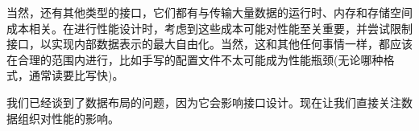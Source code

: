 当然，还有其他类型的接口，它们都有与传输大量数据的运行时、内存和存储空间成本相关。在进行性能设计时，考虑到这些成本可能对性能至关重要，并尝试限制接口，以实现内部数据表示的最大自由化。当然，这和其他任何事情一样，都应该在合理的范围内进行，比如手写的配置文件不太可能成为性能瓶颈(无论哪种格式，通常读要比写快)。 

我们已经谈到了数据布局的问题，因为它会影响接口设计。现在让我们直接关注数据组织对性能的影响。


























